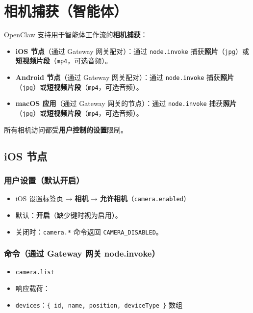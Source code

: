 \clearpage

\section{相机捕获（智能体）}


OpenClaw 支持用于智能体工作流的\textbf{相机捕获}：

\begin{itemize}
  \item \textbf{iOS 节点}（通过 Gateway 网关配对）：通过 \texttt{node.invoke} 捕获\textbf{照片}（\texttt{jpg}）或\textbf{短视频片段}（\texttt{mp4}，可选音频）。
  \item \textbf{Android 节点}（通过 Gateway 网关配对）：通过 \texttt{node.invoke} 捕获\textbf{照片}（\texttt{jpg}）或\textbf{短视频片段}（\texttt{mp4}，可选音频）。
  \item \textbf{macOS 应用}（通过 Gateway 网关的节点）：通过 \texttt{node.invoke} 捕获\textbf{照片}（\texttt{jpg}）或\textbf{短视频片段}（\texttt{mp4}，可选音频）。
\end{itemize}


所有相机访问都受\textbf{用户控制的设置}限制。

\subsection{iOS 节点}


\subsubsection{用户设置（默认开启）}


\begin{itemize}
  \item iOS 设置标签页 → \textbf{相机} → \textbf{允许相机}（\texttt{camera.enabled}）
  \item 默认：\textbf{开启}（缺少键时视为启用）。
  \item 关闭时：\texttt{camera.*} 命令返回 \texttt{CAMERA\_DISABLED}。
\end{itemize}


\subsubsection{命令（通过 Gateway 网关 node.invoke）}


\begin{itemize}
  \item \texttt{camera.list}
  \item 响应载荷：
  \item \texttt{devices}：\texttt{\{ id, name, position, deviceType \}} 数组
\end{itemize}


